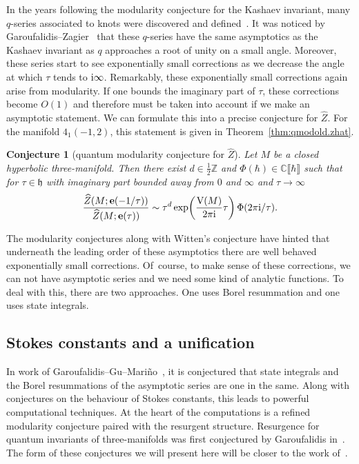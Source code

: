 \documentclass[pdftex]{sigma}
\numberwithin{equation}{section}
\newtheorem{Conjecture}[Theorem]{Conjecture}
\def\BZ{\mathbb{Z}}
\def\BC{\mathbb{C}}
\def\ae{\sim}
\def\e{\mathbf e}
\def\VC{\mathrm{VC}}
\def\UHP{\mathfrak{h}}
\def\BZ{\mathbb Z}
\def\BC{\mathbb C}
\def\VC{\mathrm{V}}
\begin{document}
In the years following the modularity conjecture for the Kashaev invariant, many $q$-series associated to knots were discovered and defined~\cite{BeemDimPas,DGG,GZ:qser,GukovMan}. It was noticed by Garoufalidis--Zagier~\cite{GZ:qser} that these $q$-series have the same asymptotics as the Kashaev invariant as $q$ approaches a root of unity on a small angle. Moreover, these series start to see exponentially small corrections as we decrease the angle at which $\tau$ tends to ${\rm i}\infty$. Remarkably, these exponentially small corrections again arise from modularity. If one bounds the imaginary part of $\tau$, these corrections become $O(1)$ and therefore must be taken into account if we make an asymptotic statement. We can formulate this into a precise conjecture for $\widehat{Z}$. For the manifold $4_{1}(-1,2)$, this statement is given in Theorem~\ref{thm:qmodold.zhat}.
\begin{Conjecture}[quantum modularity conjecture for $\widehat{Z}$]
Let $M$ be a closed hyperbolic three-manifold. Then there exist $d\in\frac{1}{2}\BZ$ and $\Phi(\hbar)\in\BC\llbracket\hbar\rrbracket$ such that for $\tau\in\UHP$ with imaginary part bounded away from $0$ and $\infty$ and $\tau\rightarrow\infty$
\[
 \frac{\widehat{Z}(M;\e(-1/\tau))}{\widehat{Z}(M;\e(\tau))}
 \ae
 \tau^{d}\exp\biggl(\frac{\VC(M)}{2\pi {\rm i}}\tau\biggr)\,
 \Phi(2\pi {\rm i}/\tau) .
\]
\end{Conjecture}
The modularity conjectures along with Witten's conjecture have hinted that underneath the leading order of these asymptotics there are well behaved exponentially small corrections. Of~course, to make sense of these corrections, we can not have asymptotic series and we need some kind of analytic functions. To deal with this, there are two approaches. One uses Borel resummation and one uses state integrals.

\subsection{Stokes constants and a unification}

In work of Garoufalidis--Gu--Mari\~no~\cite{GGM:I}, it is conjectured that state integrals and the Borel resummations of the asymptotic series are one in the same. Along with conjectures on the behaviour of Stokes constants, this leads to powerful computational techniques. At the heart of the computations is a refined modularity conjecture paired with the resurgent structure. Resurgence for quantum invariants of three-manifolds was first conjectured by Garoufalidis in~\cite{Gar:resCS}. The form of these conjectures we will present here will be closer to the work of~\cite{GGM:I}.
\end{document}
